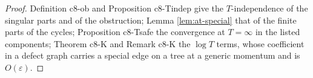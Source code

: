 \begin{proof}
Definition c8-ob and Proposition c8-Tindep give the $T$-independence of the singular parts and of the obstruction; Lemma \ref{lem:at-special} that of the finite parts of the cycles; Proposition c8-Tsafe the convergence at $T=\infty$ in the listed components; Theorem c8-K and Remark c8-K the $\log T$ terms, whose coefficient in a defect graph carries a special edge on a tree at a generic momentum and is $O(\varepsilon)$.
\end{proof}
